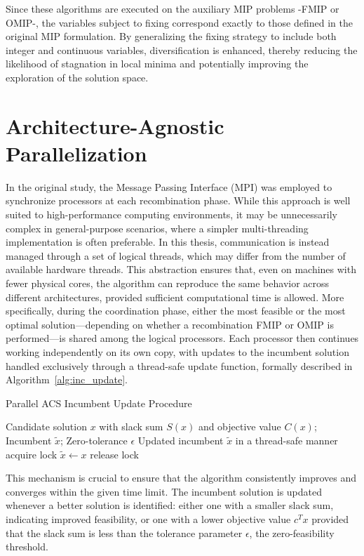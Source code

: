 Since these algorithms are executed on the auxiliary MIP problems -FMIP or OMIP-, the variables subject to fixing correspond exactly to those defined in the original MIP formulation.  
By generalizing the fixing strategy to include both integer and continuous variables, diversification is enhanced, thereby reducing the likelihood of stagnation in local minima and potentially improving the exploration of the solution space.

\section{Architecture-Agnostic Parallelization}
In the original study, the Message Passing Interface (MPI) was employed to synchronize processors at each recombination phase. While this approach is well suited to high-performance computing environments, it may be unnecessarily complex in general-purpose scenarios, where a simpler multi-threading implementation is often preferable.  
In this thesis, communication is instead managed through a set of logical threads, which may differ from the number of available hardware threads. This abstraction ensures that, even on machines with fewer physical cores, the algorithm can reproduce the same behavior across different architectures, provided sufficient computational time is allowed.  
More specifically, during the coordination phase, either the most feasible or the most optimal solution—depending on whether a recombination FMIP or OMIP is performed—is shared among the logical processors. Each processor then continues working independently on its own copy, with updates to the incumbent solution handled exclusively through a thread-safe update function, formally described in Algorithm~\ref{alg:inc_update}.  
\begin{algorithm}[H]
\caption{Parallel ACS Incumbent Update Procedure}\label{alg:inc_update}
\begin{algorithmic}[1]
\Require Candidate solution $x$ with slack sum $S(x)$ and objective value $C(x)$; Incumbent $\tilde{x}$; Zero-tolerance $\epsilon$
\Ensure Updated incumbent $\tilde{x}$ in a thread-safe manner
    \State acquire lock
        \State $\tilde{x} \gets x$
    \EndIf
    \State release lock
\EndFunction
\end{algorithmic}
\end{algorithm}

This mechanism is crucial to ensure that the algorithm consistently improves and converges within the given time limit. The incumbent solution is updated whenever a better solution is identified: either one with a smaller slack sum, indicating improved feasibility, or one with a lower objective value $c^T x$ provided that the slack sum is less than the tolerance parameter $\epsilon$, the zero-feasibility threshold.

